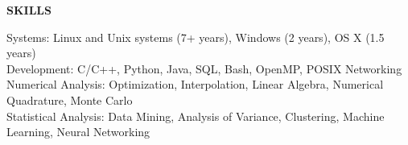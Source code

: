 \textbf{SKILLS} \\
\vspace{5pt}

Systems: Linux and Unix systems (7+ years), Windows (2 years), OS X (1.5 years) \\
\vspace{2pt}
Development: C/C++, Python, Java, SQL, Bash, OpenMP, POSIX Networking \\
\vspace{2pt}
Numerical Analysis: Optimization, Interpolation, Linear Algebra, Numerical Quadrature, Monte Carlo \\
\vspace{2pt}
Statistical Analysis: Data Mining, Analysis of Variance, Clustering, Machine Learning, Neural Networking \\
\vspace{2pt}
